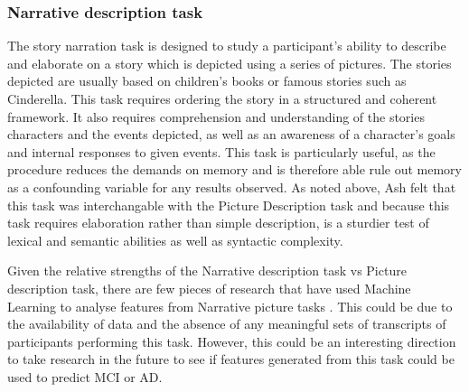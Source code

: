 \documentclass{article}
\begin{document}
\subsubsection{Narrative description task}
The story narration task is designed to study a participant's ability to describe and elaborate on a story which is depicted using a series of pictures. The stories depicted are usually based on children's books or famous stories such as Cinderella. \cite{Fraser2014} This task requires ordering the story in a structured and coherent framework. It also requires comprehension and understanding of the stories characters and the events depicted, as well as an awareness of a character's goals and internal responses to given events. This task is particularly useful, as the procedure reduces the demands on memory and is therefore able rule out memory as a confounding variable for any results observed. As noted above, Ash \cite{Ash2012} felt that this task was interchangable with the Picture Description task and because this task requires elaboration rather than simple description, is a sturdier test of lexical and semantic abilities as well as syntactic complexity. \cite{DeLira2011} \newline
\par
Given the relative strengths of the Narrative description task vs Picture description task, there are few pieces of research  that have used Machine Learning to analyse features from Narrative picture tasks \cite{Fraser2014}. This could be due to the availability of data and the absence of any meaningful sets of transcripts of participants performing this task. However, this could be an interesting direction to take research in the future to see if features generated from this task could be used to predict MCI or AD.  \newline
\par
\end{document}
